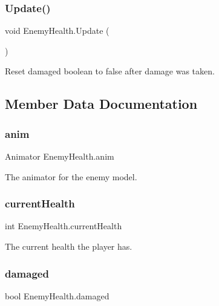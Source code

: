 \subsubsection{\texorpdfstring{Update()}{Update()}}
{\footnotesize\ttfamily void Enemy\+Health.\+Update (\begin{DoxyParamCaption}{ }\end{DoxyParamCaption})\hspace{0.3cm}{\ttfamily [private]}}



Reset damaged boolean to false after damage was taken. 



\subsection{Member Data Documentation}
\mbox{\label{class_enemy_health_a87ac641128bbd5abf5db6cc3f7bf9a87}} 
\subsubsection{\texorpdfstring{anim}{anim}}
{\footnotesize\ttfamily Animator Enemy\+Health.\+anim\hspace{0.3cm}{\ttfamily [private]}}



The animator for the enemy model. 

\mbox{\label{class_enemy_health_a87d62a02a46acef77ee2cefbb7beda64}} 
\subsubsection{\texorpdfstring{currentHealth}{currentHealth}}
{\footnotesize\ttfamily int Enemy\+Health.\+current\+Health}



The current health the player has. 

\mbox{\label{class_enemy_health_ad1b5807be63eec745d95623ce660c0c8}} 
\subsubsection{\texorpdfstring{damaged}{damaged}}
{\footnotesize\ttfamily bool Enemy\+Health.\+damaged\hspace{0.3cm}{\ttfamily [private]}}



